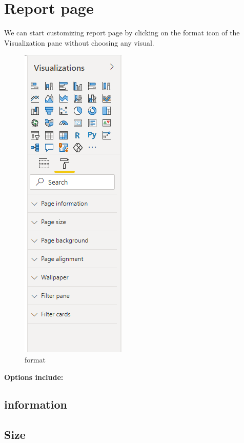 \documentclass[
]{book}
\begin{document}
\hypertarget{report-page}{%
\chapter{Report page}\label{report-page}}

We can start customizing report page by clicking on the format icon of the Visualization pane without choosing any visual.

\begin{figure}
\centering
\includegraphics{assets/page_1.png}
\caption{format}
\end{figure}

\textbf{Options include:}

\hypertarget{information}{%
\section{information}\label{information}}

\hypertarget{size}{%
\section{Size}\label{size}}
\end{document}
